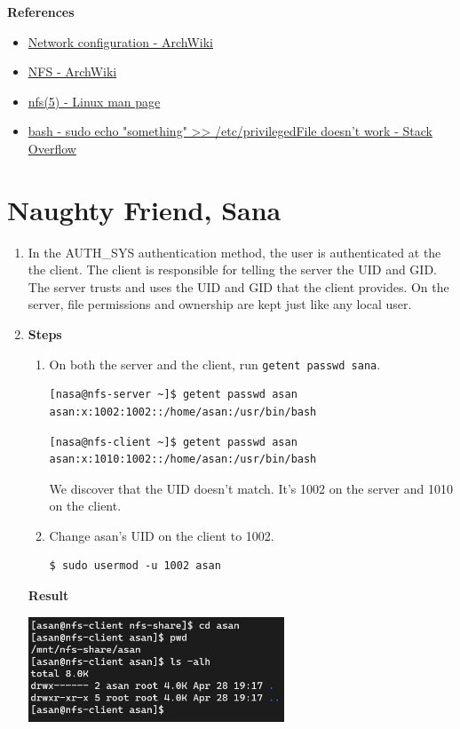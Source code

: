 \documentclass[12pt, a4paper]{article}
\begin{document}
  \textbf{References}
  \begin{itemize}
    \item \href{https://wiki.archlinux.org/title/Network_configuration}{Network configuration - ArchWiki}
    \item \href{https://wiki.archlinux.org/title/NFS}{NFS - ArchWiki}
    \item \href{https://linux.die.net/man/5/nfs}{nfs(5) - Linux man page}
    \item \href{https://stackoverflow.com/questions/84882/sudo-echo-something-etc-privilegedfile-doesnt-work}{bash - sudo echo "something" >> /etc/privilegedFile doesn't work - Stack Overflow}
  \end{itemize}

  \pagebreak
  \section{Naughty Friend, Sana}
  \begin{enumerate}[label=(\alph*)]
    \item In the AUTH\_SYS authentication method, the user is authenticated at the
    the client. The client is responsible for telling the server the UID and GID.
    The server trusts and uses the UID and GID that the client provides.
    On the server, file permissions and ownership are kept just like any local user.
    \item \textbf{Steps}
    \begin{enumerate}[label=(\arabic*)]
      \item On both the server and the client, run \verb|getent passwd sana|.
      \begin{Verbatim}[frame=single]
[nasa@nfs-server ~]$ getent passwd asan
asan:x:1002:1002::/home/asan:/usr/bin/bash
      \end{Verbatim}
      \begin{Verbatim}[frame=single]
[nasa@nfs-client ~]$ getent passwd asan
asan:x:1010:1002::/home/asan:/usr/bin/bash
      \end{Verbatim}

      We discover that the UID doesn't match. It's 1002 on the server and 1010 on the client.

      \item Change asan's UID on the client to 1002.
      \begin{Verbatim}[frame=single]
$ sudo usermod -u 1002 asan
      \end{Verbatim}
    \end{enumerate}
    \textbf{Result}

    \includegraphics[width=0.6\textwidth]{2-b_result.png}
  \end{enumerate}
\end{document}
